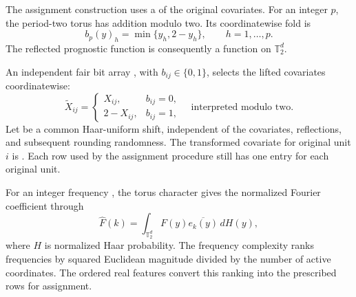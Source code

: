 The assignment construction uses a  of the original covariates. For an integer \(p\), the period-two torus \leanref{sym:Torus}{\ensuremath{\mathbb T_2^p=[0,2)^p}} has addition modulo two. Its coordinatewise fold  is
\[
b_p(y)_h=\min\{y_h,2-y_h\},
\qquad h=1,\ldots,p.
\]
The reflected prognostic function  is consequently a function on \(\mathbb T_2^d\).

An independent fair bit array , with \(b_{ij}\in\{0,1\}\), selects the lifted covariates  coordinatewise:
\[
\widetilde X_{ij}
=
\begin{cases}
X_{ij},&b_{ij}=0,\\
2-X_{ij},&b_{ij}=1,
\end{cases}
\quad\text{interpreted modulo two}.
\]
Let  be a common Haar-uniform shift, independent of the covariates, reflections, and subsequent rounding randomness. The transformed covariate for original unit \(i\) is . Each row used by the assignment procedure still has one entry for each original unit.

For an integer frequency , the torus character  gives the normalized Fourier coefficient  through
\[
\widehat F(k)
=
\int_{\mathbb T_2^d}F(y)\overline{e_k(y)}\,dH(y),
\]
where \(H\) is normalized Haar probability. The frequency complexity  ranks frequencies by squared Euclidean magnitude divided by the number of active coordinates. The ordered real features  convert this ranking into the prescribed rows for assignment.

